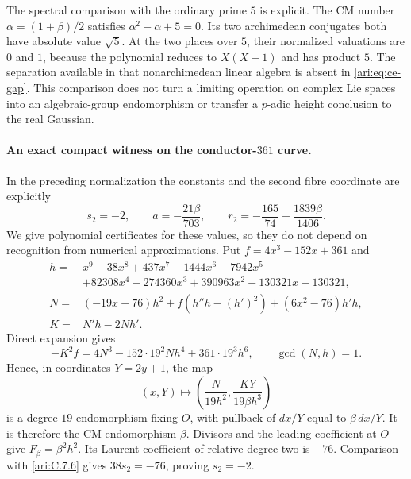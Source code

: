 The spectral comparison with the ordinary prime $5$ is
explicit. The CM number $\alpha=(1+\beta)/2$ satisfies
$\alpha^2-\alpha+5=0$. Its two archimedean conjugates
both have absolute value $\sqrt5$. At the two places over
$5$, their normalized valuations are $0$ and $1$, because
the polynomial reduces to $X(X-1)$ and has product $5$.
The separation available in that nonarchimedean linear
algebra is absent in \eqref{ari:eq:ce-gap}. This comparison
does not turn a limiting operation on complex Lie spaces
into an algebraic-group endomorphism or transfer a
$p$-adic height conclusion to the real Gaussian.

\paragraph{An exact compact witness on the conductor-$361$ curve.}
In the preceding normalization the constants and the second
fibre coordinate are explicitly
\begin{equation}\label{ari:eq:ce-explicit-witness}
 s_2=-2,\qquad a=-\frac{21\beta}{703},\qquad
 r_2=-\frac{165}{74}+\frac{1839\beta}{1406}.
\end{equation}
We give polynomial certificates for these values, so they
do not depend on recognition from numerical approximations.
Put $f=4x^3-152x+361$ and
\[
 \begin{aligned}
 h={}&x^9-38x^8+437x^7-1444x^6-7942x^5\\
     &+82308x^4-274360x^3+390963x^2-130321x-130321,\\
 N={}&(-19x+76)h^2+f(h''h-(h')^2)+(6x^2-76)h'h,\\
 K={}&N'h-2Nh'.
 \end{aligned}
\]
Direct expansion gives
\[
 -K^2f=4N^3-152\cdot19^2Nh^4+361\cdot19^3h^6,
 \qquad \gcd(N,h)=1.
\]
Hence, in coordinates $Y=2y+1$, the map
\[
 (x,Y)\longmapsto
 \left(\frac{N}{19h^2},\frac{KY}{19\beta h^3}\right)
\]
is a degree-$19$ endomorphism fixing $O$, with pullback of
$dx/Y$ equal to $\beta\,dx/Y$. It is therefore the CM
endomorphism $\beta$. Divisors and the leading coefficient
at $O$ give $F_\beta=\beta^2h^2$. Its Laurent coefficient
of relative degree two is $-76$. Comparison with \ref{ari:C.7.6}
gives $38s_2=-76$, proving $s_2=-2$.

